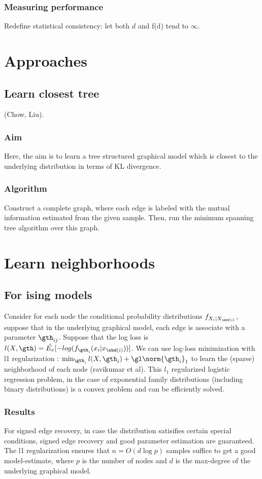 \documentclass[oneside, article]{memoir}
\begin{document}
\subsubsection{Measuring performance}
Redefine statistical consistency: let both $d$ and f(d) tend to $\infty$.

\section{Approaches}
\subsection{Learn closest tree}
(Chow, Liu).
\subsubsection{Aim}
Here, the aim is to learn a tree structured graphical model which is closest to the underlying distribution in terms of KL divergence.

\subsubsection{Algorithm}
Construct a complete graph, where each edge is labeled with the mutual information estimated from the given sample. Then, run the minimum spanning tree algorithm over this graph.

\section{Learn neighborhoods}
\subsection{For ising models}
Consider for each node the conditional probability distributions $f_{X_i|X_{\nbd(i)}}$, suppose that in the underlying graphical model, each edge is associate with a parameter $\gth_{ij}$. Suppose that the log loss is $l(X, \gth) = \hat{E_x}[-log (f_{\gth_i}(x_i| x_{\nbd(i)}))]$. We can use log-loss minimization with l1 regularization : $\min_{\gth_i} l(X, \gth_i) + \gl \norm{\gth_i}_1$ to learn the (sparse) neighborhood of each node (ravikumar et al). This $l_1$ regularized logistic regression problem, in the case of exponential family distributions (including binary distributions) is a convex problem and can be efficiently solved.

\subsubsection{Results}
For signed edge recovery, in case the distribution satisifies certain special conditions, signed edge recovery and good parameter estimation are guaranteed. The l1 regularization ensures that $n = O(d\log p)$ samples suffice to get a good model-estimate, where $p$ is the number of nodes and $d$ is the max-degree of the underlying graphical model.
\end{document}
